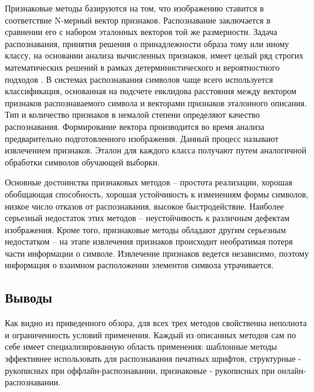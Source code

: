 Признаковые методы базируются на том, что изображению ставится в
соответствие N-мерный вектор признаков. Распознавание заключается в сравнении его
с набором эталонных векторов той же размерности. Задача распознавания, принятия
решения о принадлежности образа тому или иному классу, на основании анализа
вычисленных признаков, имеет целый ряд строгих математических решений в рамках
детерминистического и вероятностного подходов \cite{abramov, duda}. В системах распознавания
символов чаще всего используется классификация, основанная на подсчете евклидова
расстояния между вектором признаков распознаваемого символа и векторами
признаков эталонного описания. Тип и количество признаков в немалой степени
определяют качество распознавания. Формирование вектора производится во время
анализа предварительно подготовленного изображения. Данный процесс называют
извлечением признаков. Эталон для каждого класса получают путем аналогичной
обработки символов обучающей выборки.

Основные достоинства признаковых методов -- простота реализации, хорошая
обобщающая способность, хорошая устойчивость к изменениям формы символов,
низкое число отказов от распознавания, высокое быстродействие. Наиболее серьезный
недостаток этих методов -- неустойчивость к различным дефектам изображения. Кроме
того, признаковые методы обладают другим серьезным недостатком -- на этапе
извлечения признаков происходит необратимая потеря части информации о символе.
Извлечение признаков ведется независимо, поэтому информация о взаимном
расположении элементов символа утрачивается.

\subsection{Выводы}

Как видно из приведенного обзора, для всех трех методов свойственна
неполнота и ограниченность условий применения. Каждый из описанных методов сам
по себе имеет специализированную область применения: шаблонные методы
эффективнее использовать для распознавания печатных шрифтов, структурные -
рукописных при оффлайн-распознавании, признаковые - рукописных при онлайн-
распознавании.

